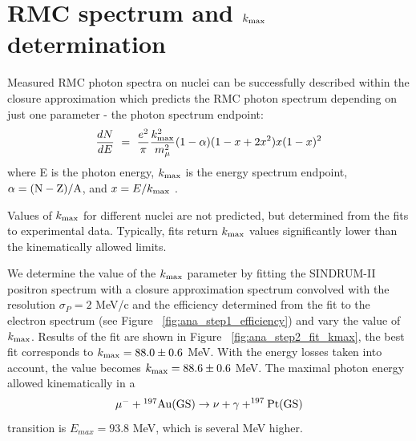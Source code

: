 \newpage
\section {RMC spectrum and $k_{\rm max}$ determination}

Measured RMC photon spectra on nuclei can be successfully described within 
the closure approximation which predicts the RMC photon spectrum depending
on just one parameter - the photon spectrum endpoint:
$$
    \frac{dN}{dE} ~=~ \frac{e^2}{\pi} \frac{k_{\rm max}^2}{ m_{\mu}^2} (1 - \alpha) (1-x+2x^2)x(1-x)^2
$$
where E is the photon energy, $k_{\rm max}$ is the energy spectrum endpoint, $\rm \alpha = (N-Z)/A$,
and $x = E/k_{\rm max}$ \cite{Christillin_1980}.

Values of $k_{\rm max}$ for different nuclei are not predicted, but determined from the fits
to experimental data. Typically, fits return $k_{\rm max}$ values significantly lower than
the kinematically allowed limits. 

We determine the value of the $k_{\rm max}$ parameter by fitting the SINDRUM-II positron spectrum
with a closure approximation spectrum convolved with the resolution $\sigma_P = 2$ MeV/c
and the efficiency determined from the fit to the electron spectrum
(see Figure ~\ref{fig:ana_step1_efficiency}) and vary the value of $k_{\rm max}$.
Results of the fit are shown in Figure ~\ref{fig:ana_step2_fit_kmax}, the best fit
corresponds to $k_{\rm max} = 88.0 \pm 0.6$ MeV.
%
With the energy losses taken into account, the value becomes  $k_{\rm max} = 88.6 \pm 0.6$ MeV.
The maximal photon energy allowed kinematically in a 
$$
\rm \mu^- + \mbox{$\rm ^{197}Au$}(GS) \rightarrow \nu +\gamma + ^{197}Pt(GS)
$$
transition is $E_{max} = 93.8$ MeV, which is several MeV higher.

